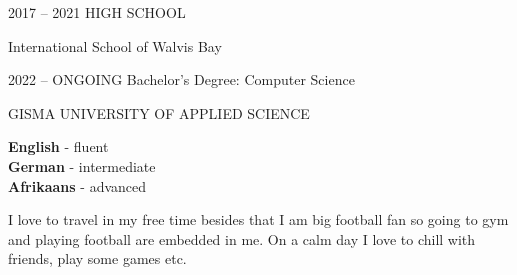 \documentclass[9pt]{developercv} %
\begin{document}


\begin{entrylist}
	\entry
		{2017 -- 2021}
		{HIGH SCHOOL}
  
            {International School of Walvis Bay}
		
	\entry
		{2022 -- ONGOING}
		{Bachelor's Degree: Computer Science}
		
            {GISMA UNIVERSITY OF APPLIED SCIENCE}
	
\end{entrylist}


\begin{minipage}[t]{0.4\textwidth} %
	\vspace{-\baselineskip} %

	
	\textbf{English} - fluent\\
	\textbf{German} - intermediate\\
	\textbf{Afrikaans} - advanced  
\end{minipage}
\hfill %
\begin{minipage}[t]{0.5\textwidth} %
	\vspace{-\baselineskip} %
	
	
	{I love to travel in my free time besides that I am big football fan so going to gym and playing football are embedded in me. On a calm day I love to chill with friends, play some games etc.}
\end{minipage}




\end{document}
